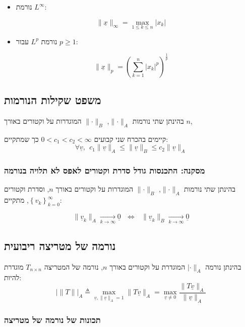 \documentclass[11pt]{article}
\begin{document}
\begin{itemize}
\item נורמת \(L^{\infty}\):
\end{itemize}
\[
\|\underline{x}\|_{\infty} = \max_{1 \le k \le n} \left| x_k \right|
\]

\begin{itemize}
\item נורמת \(L^{p}\) עבור \(p \ge 1\):
\end{itemize}
\[
\|\underline{x}\|_p = \left( \sum_{k=1}^{n} \left| x_k \right|^p \right)^{\frac{1}{p}}
\]

\subsection{משפט שקילות הנורמות}
\label{sec:orgd96a718}
בהינתן שתי נורמות \(\|\mathord{\cdot}\|_{A}\), \(\|\mathord{\cdot}\|_B\) המוגדרות על וקטורים באורך \(n\),

קיימים בהכרח שני קבועים \(0 < c_1 < c_2 < \infty\) כך שמתקיים:
\[
\forall \underline{v},\ \ c_1 \|\underline{v}\|_A \le \|\underline{v}\|_B \le c_2 \|\underline{v}\|_A
\]

\subsubsection{מסקנה: התכנסות גודל סדרת וקטורים לאפס לא תלויה בנורמה}
\label{sec:orgf0dc5ed}
בהינתן שתי נורמות \(\|\mathord{\cdot}\|_{A}\), \(\|\mathord{\cdot}\|_B\) המוגדרות על וקטורים באורך \(n\), וסדרת וקטורים \(\left\{ v_k \right\}_{k=0}^{\infty}\), מתקיים:

\[
\|\underline{v}_k\|_A \underset{k \to \infty}{\longrightarrow} \underline{0}
\ \ \ \iff\ \ \
\|\underline{v}_k\|_B \underset{k \to \infty}{\longrightarrow} \underline{0}
\]

\subsection{נורמה של מטריצה ריבועית}
\label{sec:org7951e97}
בהינתן נורמה \(|\mathord{\cdot}\|_{A}\) המוגדרת על וקטורים באורך \(n\), נורמה של המטריצה \(T_{n \times n}\) מוגדרת להיות:
\[
\left| \|T\| \right|_A
\triangleq
\max_{\underline{v}, \|\underline{v}\|_A = 1} \|T \underline{v}\|_A
=
\max_{\underline{v} \ne 0} \frac{\|T \underline{v}\|_A}{\| \underline{v}\|_A}
\]

\subsubsection{תכונות של נורמה של מטריצה}
\label{sec:orge10d033}
\end{document}
